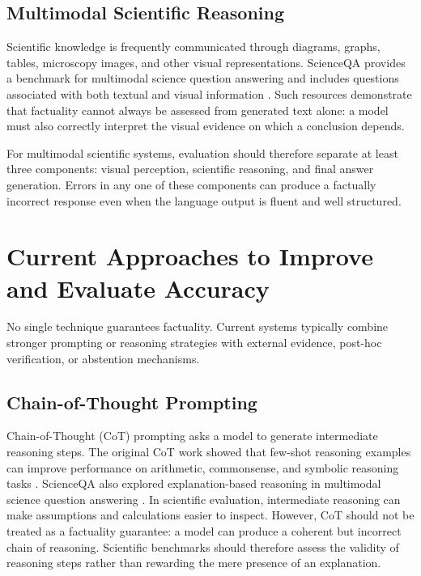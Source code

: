 \documentclass[10pt,a4paper]{article}
\begin{document}
\subsection{Multimodal Scientific Reasoning}

Scientific knowledge is frequently communicated through diagrams, graphs, tables, microscopy images, and other visual representations. ScienceQA provides a benchmark for multimodal science question answering and includes questions associated with both textual and visual information \cite{lu2022scienceqa}. Such resources demonstrate that factuality cannot always be assessed from generated text alone: a model must also correctly interpret the visual evidence on which a conclusion depends.

For multimodal scientific systems, evaluation should therefore separate at least three components: visual perception, scientific reasoning, and final answer generation. Errors in any one of these components can produce a factually incorrect response even when the language output is fluent and well structured.

\section{Current Approaches to Improve and Evaluate Accuracy}\label{sec:approaches}

No single technique guarantees factuality. Current systems typically combine stronger prompting or reasoning strategies with external evidence, post-hoc verification, or abstention mechanisms.

\subsection{Chain-of-Thought Prompting}

Chain-of-Thought (CoT) prompting asks a model to generate intermediate reasoning steps. The original CoT work showed that few-shot reasoning examples can improve performance on arithmetic, commonsense, and symbolic reasoning tasks \cite{wei2022chain}. ScienceQA also explored explanation-based reasoning in multimodal science question answering \cite{lu2022scienceqa}. In scientific evaluation, intermediate reasoning can make assumptions and calculations easier to inspect. However, CoT should not be treated as a factuality guarantee: a model can produce a coherent but incorrect chain of reasoning. Scientific benchmarks should therefore assess the validity of reasoning steps rather than rewarding the mere presence of an explanation.
\end{document}
